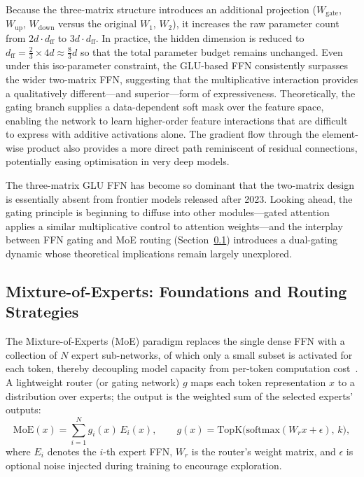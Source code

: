 Because the three-matrix structure introduces an additional projection ($W_{\mathrm{gate}}$, $W_{\mathrm{up}}$, $W_{\mathrm{down}}$ versus the original $W_1$, $W_2$), it increases the raw parameter count from $2 d \cdot d_{\mathrm{ff}}$ to $3 d \cdot d_{\mathrm{ff}}$.
In practice, the hidden dimension is reduced to $d_{\mathrm{ff}} = \tfrac{2}{3} \times 4d \approx \tfrac{8}{3}d$ so that the total parameter budget remains unchanged.
Even under this iso-parameter constraint, the GLU-based FFN consistently surpasses the wider two-matrix FFN, suggesting that the multiplicative interaction provides a qualitatively different---and superior---form of expressiveness.
Theoretically, the gating branch supplies a data-dependent soft mask over the feature space, enabling the network to learn higher-order feature interactions that are difficult to express with additive activations alone.
The gradient flow through the element-wise product also provides a more direct path reminiscent of residual connections, potentially easing optimisation in very deep models.

The three-matrix GLU FFN has become so dominant that the two-matrix design is essentially absent from frontier models released after 2023.
Looking ahead, the gating principle is beginning to diffuse into other modules---gated attention~\cite{qiu2025gated} applies a similar multiplicative control to attention weights---and the interplay between FFN gating and MoE routing (Section~\ref{subsec:moe_routing}) introduces a dual-gating dynamic whose theoretical implications remain largely unexplored.


\subsection{Mixture-of-Experts: Foundations and Routing Strategies}
\label{subsec:moe_routing}

The Mixture-of-Experts (MoE) paradigm replaces the single dense FFN with a collection of $N$ expert sub-networks, of which only a small subset is activated for each token, thereby decoupling model capacity from per-token computation cost~\cite{jacobs1991adaptive,cai2024survey}.
A lightweight router (or gating network) $g$ maps each token representation $x$ to a distribution over experts; the output is the weighted sum of the selected experts' outputs:
\begin{equation}
\label{eq:moe}
\mathrm{MoE}(x) = \sum_{i=1}^{N} g_i(x)\, E_i(x), \qquad
g(x) = \mathrm{TopK}\!\bigl(\mathrm{softmax}(W_r x + \epsilon),\, k\bigr),
\end{equation}
where $E_i$ denotes the $i$-th expert FFN, $W_r$ is the router's weight matrix, and $\epsilon$ is optional noise injected during training to encourage exploration.


